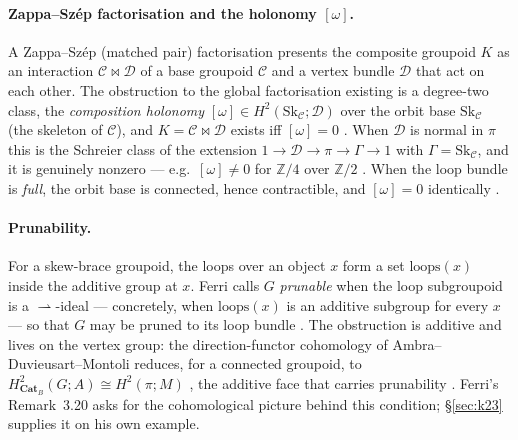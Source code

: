 \documentclass[11pt]{article}
\theoremstyle{definition}
\newcommand{\Sk}{\mathrm{Sk}}
\newcommand{\C}{\mathcal{C}}
\newcommand{\D}{\mathcal{D}}
\newcommand{\Z}{\mathbb{Z}}
\newcommand{\CatB}{\mathbf{Cat}_B}
\newcommand{\loops}{\mathrm{loops}}
\begin{document}
\paragraph{Zappa--Sz\'ep factorisation and the holonomy $[\omega]$.} A Zappa--Sz\'ep (matched
pair) factorisation presents the composite groupoid $K$ as an interaction $\C\bowtie\D$ of a
base groupoid $\C$ and a vertex bundle $\D$ that act on each other. The obstruction to the
global factorisation existing is a degree-two class, the \emph{composition holonomy}
$[\omega]\in H^2(\Sk_\C;\D)$ over the orbit base $\Sk_\C$ (the skeleton of $\C$), and
$K=\C\bowtie\D$ exists iff $[\omega]=0$ \cite{gobstr,gzs}. When $\D$ is normal in $\pi$ this
is the Schreier class of the extension $1\to\D\to\pi\to\Gamma\to1$ with $\Gamma=\Sk_\C$, and
it is genuinely nonzero --- e.g.\ $[\omega]\neq0$ for $\Z/4$ over $\Z/2$ \cite{gzs}. When the
loop bundle is \emph{full}, the orbit base is connected, hence contractible, and
$[\omega]=0$ identically \cite{sep}.

\paragraph{Prunability.} For a skew-brace groupoid, the loops over an object $x$ form a set
$\loops(x)$ inside the additive group at $x$. Ferri calls $G$ \emph{prunable} when the loop
subgroupoid is a $\rightharpoonup$-ideal --- concretely, when $\loops(x)$ is an additive
subgroup for every $x$ --- so that $G$ may be pruned to its loop bundle \cite{ferri}. The
obstruction is additive and lives on the vertex group: the direction-functor cohomology of
Ambra--Duvieusart--Montoli \cite{adm} reduces, for a connected groupoid, to
$H^2_{\CatB}(G;A)\cong H^2(\pi;M)$ \cite[T1]{sep2}, the additive face that carries
prunability \cite{sep}. Ferri's Remark~3.20 asks for the cohomological picture behind this
condition; \S\ref{sec:k23} supplies it on his own example.
\end{document}
